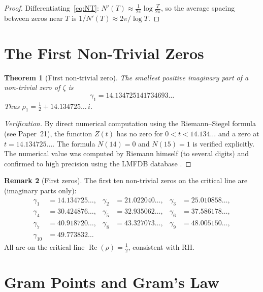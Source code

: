 \documentclass[12pt,a4paper]{amsart}
\newtheorem{theorem}{Theorem}[section]
\theoremstyle{definition}
\newtheorem{remark}[theorem]{Remark}
\DeclareMathOperator{\Re}{Re}
\begin{document}
\begin{proof}
Differentiating~\eqref{eq:NT}: $N'(T) \approx \frac{1}{2\pi}\log\frac{T}{2\pi}$,
so the average spacing between zeros near $T$ is $1/N'(T) \approx 2\pi/\log T$.
\end{proof}

\section{The First Non-Trivial Zeros}

\begin{theorem}[First non-trivial zero]
\label{thm:first_zero}
The smallest positive imaginary part of a non-trivial zero of $\zeta$ is
\[
  \gamma_1 = 14.134725141734693\ldots
\]
Thus $\rho_1 = \tfrac{1}{2} + 14.134725\ldots\,i$.
\end{theorem}

\begin{proof}[Verification]
By direct numerical computation using the Riemann--Siegel formula
(see Paper~21), the function $Z(t)$ has no zero for $0 < t < 14.134\ldots$
and a zero at $t = 14.134725\ldots$.
The formula $N(14) = 0$ and $N(15) = 1$ is verified explicitly.
The numerical value was computed by Riemann himself (to several digits)
and confirmed to high precision using the LMFDB database \cite{LMFDB}.
\end{proof}

\begin{remark}[First zeros]
The first ten non-trivial zeros on the critical line are
(imaginary parts only):
\begin{align*}
  \gamma_1 &= 14.134725\ldots, &
  \gamma_2 &= 21.022040\ldots, &
  \gamma_3 &= 25.010858\ldots, \\
  \gamma_4 &= 30.424876\ldots, &
  \gamma_5 &= 32.935062\ldots, &
  \gamma_6 &= 37.586178\ldots, \\
  \gamma_7 &= 40.918720\ldots, &
  \gamma_8 &= 43.327073\ldots, &
  \gamma_9 &= 48.005150\ldots, \\
  \gamma_{10} &= 49.773832\ldots
\end{align*}
All are on the critical line $\Re(\rho) = \tfrac{1}{2}$, consistent with RH.
\end{remark}

\section{Gram Points and Gram's Law}
\end{document}
